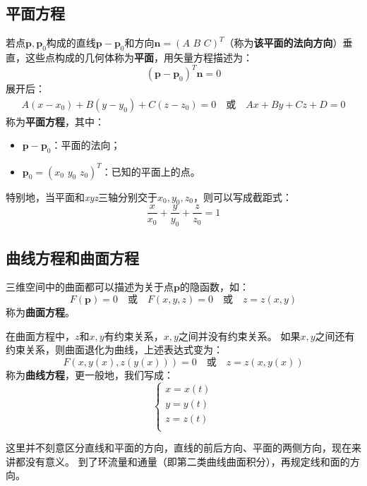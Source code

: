 \subsection{平面方程}

\begin{definition}[平面方程]
若点$\boldsymbol{p},\boldsymbol{p}_0$构成的直线$\boldsymbol{p}-\boldsymbol{p}_0$和方向$\boldsymbol{n}=\left( A\,\,B\,\,C \right) ^T$（称为{\bf 该平面的法向方向}）垂直，这些点构成的几何体称为{\bf 平面}，用矢量方程描述为：
\[
\left( \boldsymbol{p}-\boldsymbol{p}_0 \right) ^T\boldsymbol{n}=0
\]
展开后：
\begin{align*}
A\left( x-x_0 \right) +B\left( y-y_0 \right) +C\left( z-z_0 \right) =0 \quad \text{或} \quad Ax+By+Cz+D=0
\end{align*}
称为{\bf 平面方程}，其中：
\begin{itemize}
    \item $\boldsymbol{p}-\boldsymbol{p}_0$：平面的法向；
    \item $\boldsymbol{p}_0=\left( x_0\,\,y_0\,\,z_0 \right) ^T$：已知的平面上的点。
\end{itemize}
\end{definition}

特别地，当平面和{\it xyz}三轴分别交于$x_0,y_0,z_0$，则可以写成截距式：
\[
\frac{x}{x_0}+\frac{y}{y_0}+\frac{z}{z_0}=1
\]

\subsection{曲线方程和曲面方程}

\begin{definition}[曲面方程]
三维空间中的曲面都可以描述为关于点$\boldsymbol{p}$的隐函数，如：
\[
F\left( \boldsymbol{p} \right) =0 \quad \text{或} \quad F\left( x,y,z \right) =0 \quad \text{或} \quad z=z\left( x,y \right)
\]
称为{\bf 曲面方程}。
\end{definition}

\begin{definition}[曲线方程]
在曲面方程中，$z$和$x,y$有约束关系，$x,y$之间并没有约束关系。
如果$x,y$之间还有约束关系，则曲面退化为曲线，上述表达式变为：
\[
F\left( x,y\left( x \right) ,z\left(y\left( x \right) \right) \right) =0 \quad \text{或} \quad z=z\left( x,y\left( x \right) \right)
\]
称为{\bf 曲线方程}，更一般地，我们写成：
\[
\left\{ \begin{array}{c}
	x=x\left( t \right)\\
	y=y\left( t \right)\\
	z=z\left( t \right)\\
\end{array} \right.
\]
\end{definition}

\begin{tcolorbox}
这里并不刻意区分直线和平面的方向，直线的前后方向、平面的两侧方向，现在来讲都没有意义。
到了环流量和通量（即第二类曲线曲面积分），再规定线和面的方向。
\end{tcolorbox}




